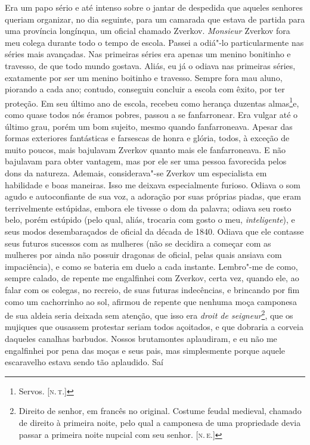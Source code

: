 Era um papo sério e até intenso sobre o jantar de despedida que aqueles
senhores queriam organizar, no dia seguinte, para um camarada que estava
de partida para uma província longínqua, um oficial chamado Zverkov.
\emph{Monsieur} Zverkov fora meu colega durante todo o tempo de escola.
Passei a odiá"-lo particularmente nas séries mais avançadas. Nas
primeiras séries era apenas um menino bonitinho e travesso, de que todo
mundo gostava. Aliás, eu já o odiava nas primeiras séries, exatamente
por ser um menino boitinho e travesso. Sempre fora mau aluno, piorando a
cada ano; contudo, conseguiu concluir a escola com êxito, por ter
proteção. Em seu último ano de escola, recebeu como herança duzentas
almas\footnote{Servos. {[}\textsc{n.\,t.}{]}}e, como quase todos nós éramos pobres,
passou a se fanfarronear. Era vulgar até o último grau, porém um bom
sujeito, mesmo quando fanfarroneava. Apesar das formas exteriores
fantásticas e farsescas de honra e glória, todos, à exceção de muito
poucos, mais bajulavam Zverkov quanto mais ele fanfarroneava. E não
bajulavam para obter vantagem, mas por ele ser uma pessoa favorecida
pelos dons da natureza. Ademais, considerava"-se Zverkov um especialista
em habilidade e boas maneiras. Isso me deixava especialmente furioso.
Odiava o som agudo e autoconfiante de sua voz, a adoração por suas
próprias piadas, que eram terrivelmente estúpidas, embora ele tivesse o
dom da palavra; odiava seu rosto belo, porém estúpido (pelo qual, aliás,
trocaria com gosto o meu, \emph{inteligente}), e seus modos
desembaraçados de oficial da década de 1840. Odiava que ele contasse
seus futuros sucessos com as mulheres (não se decidira a começar com as
mulheres por ainda não possuir dragonas de oficial, pelas quais ansiava
com impaciência), e como se bateria em duelo a cada instante. Lembro"-me
de como, sempre calado, de repente me engalfinhei com Zverkov, certa
vez, quando ele, ao falar com os colegas, no recreio, de suas futuras
indecências, e brincando por fim como um cachorrinho ao sol, afirmou de
repente que nenhuma moça camponesa de sua aldeia seria deixada sem
atenção, que isso era \emph{droit de seigneur}\footnote{Direito de
  senhor, em francês no original. Costume feudal medieval, chamado de
  direito à primeira noite, pelo qual a camponesa de uma propriedade
  devia passar a primeira noite nupcial com seu senhor. {[}\textsc{n.\,e.}{]}},
que os mujiques que ousassem protestar seriam todos açoitados, e que
dobraria a corveia daqueles canalhas barbudos. Nossos brutamontes
aplaudiram, e eu não me engalfinhei por pena das moças e seus pais, mas
simplesmente porque aquele escaravelho estava sendo tão aplaudido. Saí
